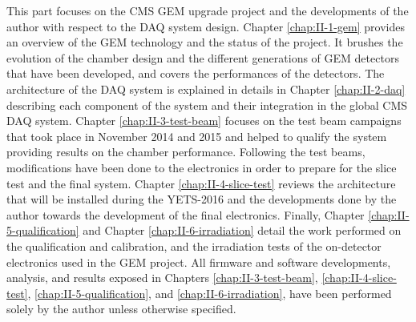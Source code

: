 This part focuses on the CMS GEM upgrade project and the developments of the author with respect to the DAQ system design. Chapter \ref{chap:II-1-gem} provides an overview of the GEM technology and the status of the project. It brushes the evolution of the chamber design and the different generations of GEM detectors that have been developed, and covers the performances of the detectors. The architecture of the DAQ system is explained in details in Chapter \ref{chap:II-2-daq} describing each component of the system and their integration in the global CMS DAQ system. Chapter \ref{chap:II-3-test-beam} focuses on the test beam campaigns that took place in November 2014 and 2015 and helped to qualify the system providing results on the chamber performance. Following the test beams, modifications have been done to the electronics in order to prepare for the slice test and the final system. Chapter \ref{chap:II-4-slice-test} reviews the architecture that will be installed during the YETS-2016 and the developments done by the author towards the development of the final electronics. Finally, Chapter \ref{chap:II-5-qualification} and Chapter \ref{chap:II-6-irradiation} detail the work performed on the qualification and calibration, and the irradiation tests of the on-detector electronics used in the GEM project. All firmware and software developments, analysis, and results exposed in Chapters \ref{chap:II-3-test-beam}, \ref{chap:II-4-slice-test}, \ref{chap:II-5-qualification}, and \ref{chap:II-6-irradiation}, have been performed solely by the author unless otherwise specified.
